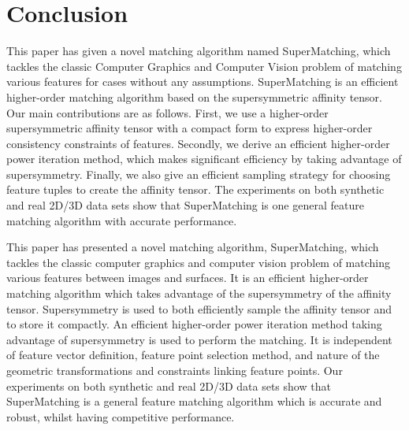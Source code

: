 \section{Conclusion}
\label{sec:conclusion}

This paper has given a novel matching algorithm named SuperMatching,
which tackles the classic Computer Graphics and Computer Vision problem of matching various features for cases without any assumptions.
SuperMatching is an efficient higher-order matching algorithm based on the supersymmetric affinity tensor.
Our main contributions are as follows.
First, we use a  higher-order supersymmetric affinity tensor with a compact form to express higher-order consistency constraints of features.
Secondly, we derive an efficient higher-order power iteration method, which makes significant efficiency by taking advantage of supersymmetry.
Finally, we also give an efficient sampling strategy for choosing feature tuples to create the affinity tensor.
The experiments on both synthetic and real 2D/3D data sets show that SuperMatching is one general feature matching algorithm with accurate performance.

This paper has presented a novel matching algorithm, SuperMatching,
which tackles the classic computer graphics and computer vision problem of matching various features between images and surfaces.
It is an efficient higher-order matching algorithm which takes advantage of the supersymmetry of the affinity tensor. 
Supersymmetry is used to both efficiently sample the affinity tensor and to store it compactly. 
An efficient higher-order power iteration method taking advantage of supersymmetry is used to perform the matching.
It is independent of feature vector definition,
feature point selection method, and nature of the geometric transformations and constraints linking feature points.
Our experiments on both synthetic and real 2D/3D data sets show that SuperMatching is a general feature matching algorithm which is accurate and robust, whilst having competitive performance.



